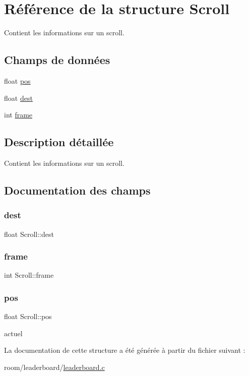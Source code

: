 \hypertarget{struct_scroll}{}\section{Référence de la structure Scroll}
\label{struct_scroll}


Contient les informations sur un scroll.  


\subsection*{Champs de données}
\begin{DoxyCompactItemize}
\item 
float \hyperlink{struct_scroll_ac1aac3cb506521f98d5e9726b3a18bd0}{pos}
\item 
float \hyperlink{struct_scroll_a59e7c8c2f4471cffb618b50ed1387ca4}{dest}
\item 
int \hyperlink{struct_scroll_a5a7cb8343a8c184bf631f6292ca90406}{frame}
\end{DoxyCompactItemize}


\subsection{Description détaillée}
Contient les informations sur un scroll. 

\subsection{Documentation des champs}
\mbox{\label{struct_scroll_a59e7c8c2f4471cffb618b50ed1387ca4}} 
\subsubsection{\texorpdfstring{dest}{dest}}
{\footnotesize\ttfamily float Scroll\+::dest}

\mbox{\label{struct_scroll_a5a7cb8343a8c184bf631f6292ca90406}} 
\subsubsection{\texorpdfstring{frame}{frame}}
{\footnotesize\ttfamily int Scroll\+::frame}

\mbox{\label{struct_scroll_ac1aac3cb506521f98d5e9726b3a18bd0}} 
\subsubsection{\texorpdfstring{pos}{pos}}
{\footnotesize\ttfamily float Scroll\+::pos}

actuel 

La documentation de cette structure a été générée à partir du fichier suivant \+:\begin{DoxyCompactItemize}
\item 
room/leaderboard/\hyperlink{leaderboard_8c}{leaderboard.\+c}\end{DoxyCompactItemize}
